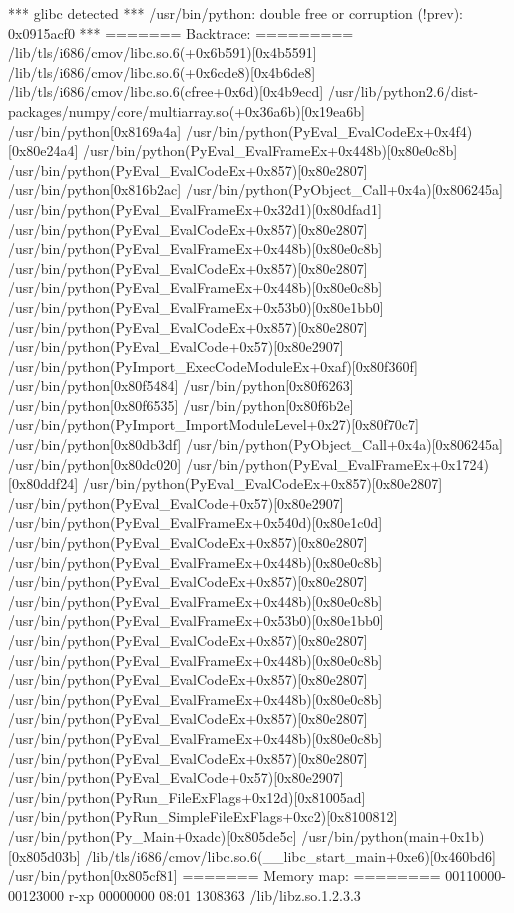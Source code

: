 *** glibc detected *** /usr/bin/python: double free or corruption (!prev): 0x0915acf0 ***
======= Backtrace: =========
/lib/tls/i686/cmov/libc.so.6(+0x6b591)[0x4b5591]
/lib/tls/i686/cmov/libc.so.6(+0x6cde8)[0x4b6de8]
/lib/tls/i686/cmov/libc.so.6(cfree+0x6d)[0x4b9ecd]
/usr/lib/python2.6/dist-packages/numpy/core/multiarray.so(+0x36a6b)[0x19ea6b]
/usr/bin/python[0x8169a4a]
/usr/bin/python(PyEval_EvalCodeEx+0x4f4)[0x80e24a4]
/usr/bin/python(PyEval_EvalFrameEx+0x448b)[0x80e0c8b]
/usr/bin/python(PyEval_EvalCodeEx+0x857)[0x80e2807]
/usr/bin/python[0x816b2ac]
/usr/bin/python(PyObject_Call+0x4a)[0x806245a]
/usr/bin/python(PyEval_EvalFrameEx+0x32d1)[0x80dfad1]
/usr/bin/python(PyEval_EvalCodeEx+0x857)[0x80e2807]
/usr/bin/python(PyEval_EvalFrameEx+0x448b)[0x80e0c8b]
/usr/bin/python(PyEval_EvalCodeEx+0x857)[0x80e2807]
/usr/bin/python(PyEval_EvalFrameEx+0x448b)[0x80e0c8b]
/usr/bin/python(PyEval_EvalFrameEx+0x53b0)[0x80e1bb0]
/usr/bin/python(PyEval_EvalCodeEx+0x857)[0x80e2807]
/usr/bin/python(PyEval_EvalCode+0x57)[0x80e2907]
/usr/bin/python(PyImport_ExecCodeModuleEx+0xaf)[0x80f360f]
/usr/bin/python[0x80f5484]
/usr/bin/python[0x80f6263]
/usr/bin/python[0x80f6535]
/usr/bin/python[0x80f6b2e]
/usr/bin/python(PyImport_ImportModuleLevel+0x27)[0x80f70c7]
/usr/bin/python[0x80db3df]
/usr/bin/python(PyObject_Call+0x4a)[0x806245a]
/usr/bin/python[0x80dc020]
/usr/bin/python(PyEval_EvalFrameEx+0x1724)[0x80ddf24]
/usr/bin/python(PyEval_EvalCodeEx+0x857)[0x80e2807]
/usr/bin/python(PyEval_EvalCode+0x57)[0x80e2907]
/usr/bin/python(PyEval_EvalFrameEx+0x540d)[0x80e1c0d]
/usr/bin/python(PyEval_EvalCodeEx+0x857)[0x80e2807]
/usr/bin/python(PyEval_EvalFrameEx+0x448b)[0x80e0c8b]
/usr/bin/python(PyEval_EvalCodeEx+0x857)[0x80e2807]
/usr/bin/python(PyEval_EvalFrameEx+0x448b)[0x80e0c8b]
/usr/bin/python(PyEval_EvalFrameEx+0x53b0)[0x80e1bb0]
/usr/bin/python(PyEval_EvalCodeEx+0x857)[0x80e2807]
/usr/bin/python(PyEval_EvalFrameEx+0x448b)[0x80e0c8b]
/usr/bin/python(PyEval_EvalCodeEx+0x857)[0x80e2807]
/usr/bin/python(PyEval_EvalFrameEx+0x448b)[0x80e0c8b]
/usr/bin/python(PyEval_EvalCodeEx+0x857)[0x80e2807]
/usr/bin/python(PyEval_EvalFrameEx+0x448b)[0x80e0c8b]
/usr/bin/python(PyEval_EvalCodeEx+0x857)[0x80e2807]
/usr/bin/python(PyEval_EvalCode+0x57)[0x80e2907]
/usr/bin/python(PyRun_FileExFlags+0x12d)[0x81005ad]
/usr/bin/python(PyRun_SimpleFileExFlags+0xc2)[0x8100812]
/usr/bin/python(Py_Main+0xadc)[0x805de5c]
/usr/bin/python(main+0x1b)[0x805d03b]
/lib/tls/i686/cmov/libc.so.6(__libc_start_main+0xe6)[0x460bd6]
/usr/bin/python[0x805cf81]
======= Memory map: ========
00110000-00123000 r-xp 00000000 08:01 1308363    /lib/libz.so.1.2.3.3

